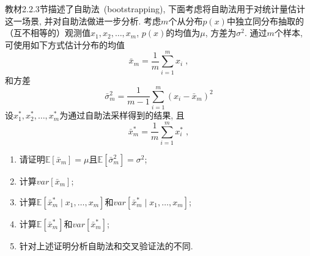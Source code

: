 \documentclass[answers]{exam}  %
\begin{document}
\begin{questions}
	教材2.2.3节描述了自助法~(bootstrapping), 下面考虑将自助法用于对统计量估计这一场景, 并对自助法做进一步分析. 
考虑$m$个从分布$p(x)$中独立同分布抽取的（互不相等的）观测值$x_1, x_2, \ldots, x_m$, $p(x)$的均值为$\mu$, 方差为$\sigma^2$. 通过$m$个样本, 可使用如下方式估计分布的均值
\begin{equation}
\bar{x}_m = \frac{1}{m} \sum_{i=1}^{m} x_{i}\;,\label{ch2_eq:estimate_mean}
\end{equation}
和方差
\begin{equation}
\bar{\sigma}^2_m=\frac{1}{m-1} \sum_{i=1}^{m}\left(x_{i}-\bar{x}_m\right)^{2}\label{ch2_eq:estimate_variance}
\end{equation}
设$x^*_1, x^*_2, \ldots, x^*_m$为通过自助法采样得到的结果, 且
\begin{equation}
\bar{x}^*_m = \frac{1}{m} \sum_{i=1}^{m} x^*_{i}\;,
\end{equation}
\begin{enumerate}
    \item 请证明$\mathbb E[\bar{x}_m] = \mu$且$\mathbb E[\bar{\sigma}^2_m] = \sigma^2$;
    \item 计算$var[\bar{x}_m]$;
    \item 计算$\mathbb E[\bar{x}^*_m \mid x_1, \ldots, x_m]$和$var[\bar{x}^*_m \mid x_1, \ldots, x_m]$;
    \item 计算$\mathbb E[\bar{x}^*_m]$和$var[\bar{x}^*_m]$;
    \item 针对上述证明分析自助法和交叉验证法的不同.
\end{enumerate}
\end{questions}
\end{document}
